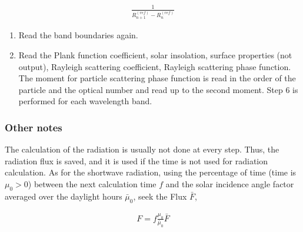 \begin{eqnarray}
   \frac{1}{R_{n+1}^{(r e f)}-R_{n}^{(r e f)}}
\end{eqnarray}

\begin{enumerate}
\def\labelenumi{\arabic{enumi}.}
\setcounter{enumi}{4}
\item
  Read the band boundaries again.
\item
  Read the Plank function coefficient, solar insolation, surface
  properties (not output), Rayleigh scattering coefficient, Rayleigh
  scattering phase function. The moment for particle scattering phase
  function is read in the order of the particle and the optical number
  and read up to the second moment. Step 6 is performed for each
  wavelength band.
\end{enumerate}

\hypertarget{other-notes}{%
\subsubsection{Other notes}\label{other-notes}}

The calculation of the radiation is usually not done at every step.
Thus, the radiation flux is saved, and it is used if the time is not
used for radiation calculation. As for the shortwave radiation, using
the percentage of time (time is \(\mu_{0}>0\)) between the next
calculation time \(f\) and the solar incidence angle factor averaged
over the daylight hours \(\bar{\mu}_{0}\), seek the Flux \(\bar{F}\),

\begin{eqnarray}
{F}=f \frac{\mu_{0}}{\bar{\mu}_{0}} \bar{F}
\end{eqnarray}

